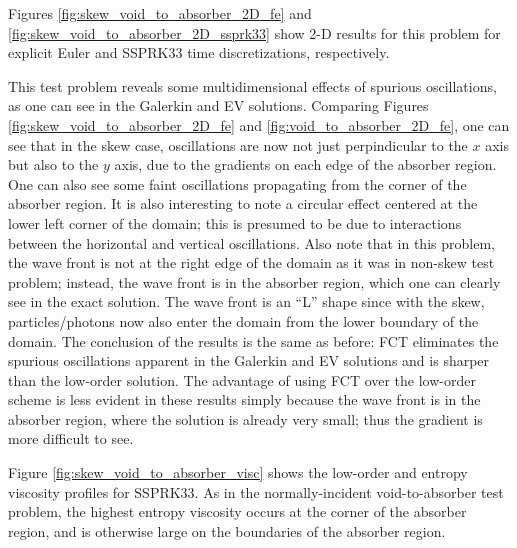 Figures \ref{fig:skew_void_to_absorber_2D_fe} and
\ref{fig:skew_void_to_absorber_2D_ssprk33} show 2-D results for this problem
for explicit Euler and SSPRK33 time discretizations, respectively.

This test problem reveals some multidimensional effects of spurious
oscillations, as one can see in the Galerkin and EV solutions. Comparing
Figures \ref{fig:skew_void_to_absorber_2D_fe} and \ref{fig:void_to_absorber_2D_fe},
one can see that in the skew case, oscillations are now not just perpindicular
to the $x$ axis but also to the $y$ axis, due to the gradients on each
edge of the absorber region. One can also see some faint oscillations
propagating from the corner of the absorber region. It is also interesting
to note a circular effect centered at the lower left corner of the domain;
this is presumed to be due to interactions between the horizontal and
vertical oscillations. Also note that in this problem, the wave front
is not at the right edge of the domain as it was in non-skew test
problem; instead, the wave front is in the absorber region, which
one can clearly see in the exact solution. The wave front is an ``L''
shape since with the skew, particles/photons now also enter the domain
from the lower boundary of the domain. The conclusion of the results
is the same as before: FCT eliminates the spurious oscillations apparent
in the Galerkin and EV solutions and is sharper than the low-order
solution. The advantage of using FCT over the low-order scheme is
less evident in these results simply because the wave front is
in the absorber region, where the solution is already very small;
thus the gradient is more difficult to see.

Figure \ref{fig:skew_void_to_absorber_visc} shows the low-order
and entropy viscosity profiles for SSPRK33. As in the normally-incident
void-to-absorber test problem, the highest entropy viscosity occurs
at the corner of the absorber region, and is otherwise large on
the boundaries of the absorber region.

